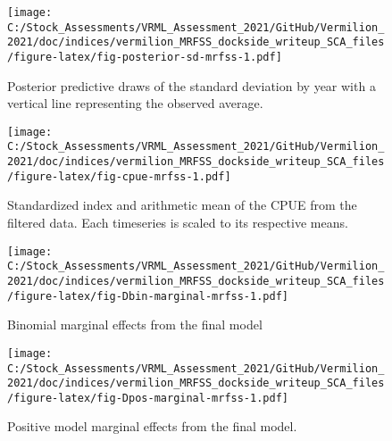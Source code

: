 \documentclass[11pt,
  english,
  a4paper,
]{article}
\begin{document}
\begin{figure}
\centering
\texttt{[image: C:/Stock\_Assessments/VRML\_Assessment\_2021/GitHub/Vermilion\_2021/doc/indices/vermilion\_MRFSS\_dockside\_writeup\_SCA\_files/figure-latex/fig-posterior-sd-mrfss-1.pdf]}
\caption{\label{fig:fig-posterior-sd-mrfss}Posterior predictive draws of the standard deviation by year with a vertical line representing the observed average.}
\end{figure}

\begin{figure}
\centering
\texttt{[image: C:/Stock\_Assessments/VRML\_Assessment\_2021/GitHub/Vermilion\_2021/doc/indices/vermilion\_MRFSS\_dockside\_writeup\_SCA\_files/figure-latex/fig-cpue-mrfss-1.pdf]}
\caption{\label{fig:fig-cpue-mrfss}Standardized index and arithmetic mean of the CPUE from the filtered data. Each timeseries is scaled to its respective means.}
\end{figure}

\begin{figure}
\centering
\texttt{[image: C:/Stock\_Assessments/VRML\_Assessment\_2021/GitHub/Vermilion\_2021/doc/indices/vermilion\_MRFSS\_dockside\_writeup\_SCA\_files/figure-latex/fig-Dbin-marginal-mrfss-1.pdf]}
\caption{\label{fig:fig-Dbin-marginal-mrfss}Binomial marginal effects from the final model}
\end{figure}

\begin{figure}
\centering
\texttt{[image: C:/Stock\_Assessments/VRML\_Assessment\_2021/GitHub/Vermilion\_2021/doc/indices/vermilion\_MRFSS\_dockside\_writeup\_SCA\_files/figure-latex/fig-Dpos-marginal-mrfss-1.pdf]}
\caption{\label{fig:fig-Dpos-marginal-mrfss}Positive model marginal effects from the final model.}
\end{figure}
\end{document}
